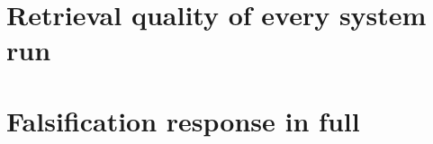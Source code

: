 \documentclass[11pt]{article}
\newcommand{\movedref}{Appendix}            %
\newcommand{\movedref}{Section}
\begin{document}


\appendix
\makeatletter
\renewcommand{\thesection}{\ifnum\c@section>26 A\@Alph{\numexpr\c@section-26\relax}\else\@Alph\c@section\fi}
\makeatother

\section{Retrieval quality of every system run}
\label{app:retrieval}

\begin{table}[t]
\centering
{}
\caption{Retrieval quality of every system run. The four above the rule carry the matched comparison. Their ranking differs between datasets, and their spread is far larger on HotpotQA. jina-embeddings-v3 is reported separately (\movedref~\ref{sec:control}). It sits inside the band on HotpotQA, but on Natural Questions it is the weakest system by ten points, where it triples the spread and fails TOST equivalence against all four at $\pm$0.02.}
\label{tab:1}
\end{table}

\section{Falsification response in full}
\label{app:falsification}
\end{document}
